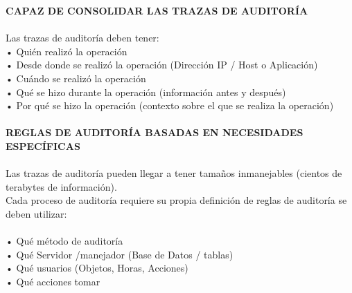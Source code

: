 \documentclass[twoside,twocolumn]{article}
\begin{document}
\begin{flushright}
\begin{itemize}
 \textbf{CAPAZ DE CONSOLIDAR LAS TRAZAS DE AUDITORÍA }\\
 \textbf{}\\ 
Las trazas de auditoría deben tener: 
 \textbf{}\\ 
•	Quién realizó la operación  \textbf{}\\ 
•	Desde donde se realizó la operación (Dirección IP / Host o Aplicación)  \textbf{}\\ 
•	Cuándo se realizó la operación  \textbf{}\\ 
•	Qué se hizo durante la operación (información antes y después)  \textbf{}\\ 
•	Por qué se hizo la operación (contexto sobre el que se realiza la operación) \textbf{}\\ 
 \textbf{}\\ 
 \textbf{REGLAS DE AUDITORÍA BASADAS EN NECESIDADES ESPECÍFICAS }\\ 
 \textbf{}\\ 
Las trazas de auditoría pueden llegar a tener tamaños inmanejables (cientos de terabytes de información).  \textbf{}\\ 
Cada proceso de auditoría requiere su propia definición de reglas de auditoría se deben utilizar:  \textbf{}\\ 
 \textbf{}\\ 
•	Qué método de auditoría  \textbf{}\\ 
•	Qué Servidor /manejador (Base de Datos / tablas)  \textbf{}\\ 
•	Qué usuarios (Objetos, Horas, Acciones)  \textbf{}\\ 
•	Qué acciones tomar  \textbf{}\\ 



\end{itemize}
\end{flushright}
\end{document}
